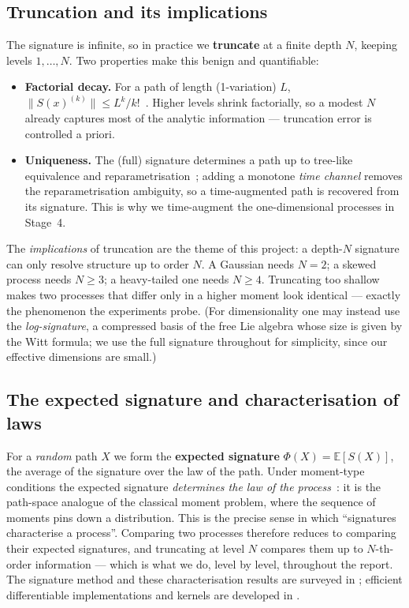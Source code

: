 \documentclass[11pt]{article}
\newcommand{\E}{\mathbb{E}}
\begin{document}
\subsection{Truncation and its implications}
The signature is infinite, so in practice we \textbf{truncate} at a finite depth
$N$, keeping levels $1,\dots,N$. Two properties make this benign and quantifiable:
\begin{itemize}
  \item \textbf{Factorial decay.} For a path of length (1-variation) $L$,
        $\big\|S(x)^{(k)}\big\| \le L^{k}/k!$~\cite{LyonsCaruanaLevy2007}. Higher
        levels shrink factorially, so a modest $N$ already captures most of the
        analytic information --- truncation error is controlled a priori.
  \item \textbf{Uniqueness.} The (full) signature determines a path up to
        tree-like equivalence and reparametrisation~\cite{HamblyLyons2010,
        BoedihardjoGengLyonsYang2016}; adding a monotone \emph{time channel}
        removes the reparametrisation ambiguity, so a time-augmented path is
        recovered from its signature. This is why we time-augment the
        one-dimensional processes in Stage~4.
\end{itemize}
The \emph{implications} of truncation are the theme of this project: a depth-$N$
signature can only resolve structure up to order $N$. A Gaussian needs $N=2$; a
skewed process needs $N\ge3$; a heavy-tailed one needs $N\ge4$. Truncating too
shallow makes two processes that differ only in a higher moment look identical ---
exactly the phenomenon the experiments probe. (For dimensionality one may instead
use the \emph{log-signature}, a compressed basis of the free Lie algebra whose
size is given by the Witt formula; we use the full signature throughout for
simplicity, since our effective dimensions are small.)

\subsection{The expected signature and characterisation of laws}
For a \emph{random} path $X$ we form the \textbf{expected signature}
$\Phi(X) = \E[S(X)]$, the average of the signature over the law of the path. Under
moment-type conditions the expected signature \emph{determines the law of the
process}~\cite{Fawcett2003,LevinLyonsNi2013,ChevyrevOberhauser2022}: it is the
path-space analogue of the classical moment problem, where the sequence of moments
pins down a distribution. This is the precise sense in which ``signatures
characterise a process''. Comparing two processes therefore reduces to comparing
their expected signatures, and truncating at level $N$ compares them up to
$N$-th-order information --- which is what we do, level by level, throughout the
report. The signature method and these characterisation results are surveyed in
\cite{ChevyrevKormilitzin2016}; efficient differentiable implementations and
kernels are developed in \cite{KidgerBonnier2019,KidgerLyons2021,Salvi2021}.
\end{document}
